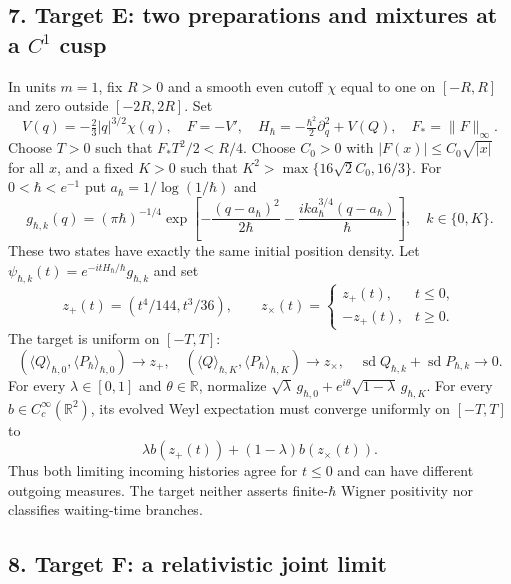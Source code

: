 \documentclass[11pt,a4paper]{article}
\begin{document}
\hypertarget{target-e-two-preparations-and-mixtures-at-a-c1-cusp}{%
\subsection{\texorpdfstring{7. Target E: two preparations and mixtures
at a \(C^1\)
cusp}{7. Target E: two preparations and mixtures at a C\^{}1 cusp}}\label{target-e-two-preparations-and-mixtures-at-a-c1-cusp}}

In units \(m=1\), fix \(R>0\) and a smooth even cutoff \(\chi\) equal to
one on \([-R,R]\) and zero outside \([-2R,2R]\). Set
\[V(q)=-\tfrac23|q|^{3/2}\chi(q),\quad F=-V',\quad
 H_\hbar=-\tfrac{\hbar^2}{2}\partial_q^2+V(Q),\quad
 F_*=\|F\|_\infty.\] Choose \(T>0\) such that \(F_*T^2/2<R/4\). Choose
\(C_0>0\) with \(|F(x)|\le C_0\sqrt{|x|}\) for all \(x\), and a fixed
\(K>0\) such that \(K^2>\max\{16\sqrt2C_0,16/3\}\). For
\(0<\hbar<e^{-1}\) put \(a_\hbar=1/\log(1/\hbar)\) and \[
 g_{\hbar,k}(q)=(\pi\hbar)^{-1/4}
 \exp\!\left[-\frac{(q-a_\hbar)^2}{2\hbar}
             -\frac{ik a_\hbar^{3/4}(q-a_\hbar)}{\hbar}\right],
 \quad k\in\{0,K\}. \tag{E0}
\] These two states have exactly the same initial position density. Let
\(\psi_{\hbar,k}(t)=e^{-itH_\hbar/\hbar}g_{\hbar,k}\) and set \[
 z_+(t)=(t^4/144,t^3/36),\qquad
 z_\times(t)=
 \begin{cases}z_+(t),&t\le0,\\-z_+(t),&t\ge0.\end{cases} \tag{E1}
\] The target is uniform on \([-T,T]\): \[
 (\langle Q\rangle_{\hbar,0},\langle P_\hbar\rangle_{\hbar,0})\to z_+,
 \quad
 (\langle Q\rangle_{\hbar,K},\langle P_\hbar\rangle_{\hbar,K})\to z_\times,
 \quad
 \operatorname{sd}Q_{\hbar,k}+\operatorname{sd}P_{\hbar,k}\to0.
 \tag{E2}
\] For every \(\lambda\in[0,1]\) and \(\theta\in\mathbb R\), normalize
\(\sqrt\lambda\,g_{\hbar,0}  +e^{i\theta}\sqrt{1-\lambda}\,g_{\hbar,K}\).
For every \(b\in C_c^\infty(\mathbb R^2)\), its evolved Weyl expectation
must converge uniformly on \([-T,T]\) to
\[\lambda b(z_+(t))+(1-\lambda)b(z_\times(t)). \tag{E3}\] Thus both
limiting incoming histories agree for \(t\le0\) and can have different
outgoing measures. The target neither asserts finite-\(\hbar\) Wigner
positivity nor classifies waiting-time branches.

\hypertarget{target-f-a-relativistic-joint-limit}{%
\subsection{8. Target F: a relativistic joint
limit}\label{target-f-a-relativistic-joint-limit}}
\end{document}
